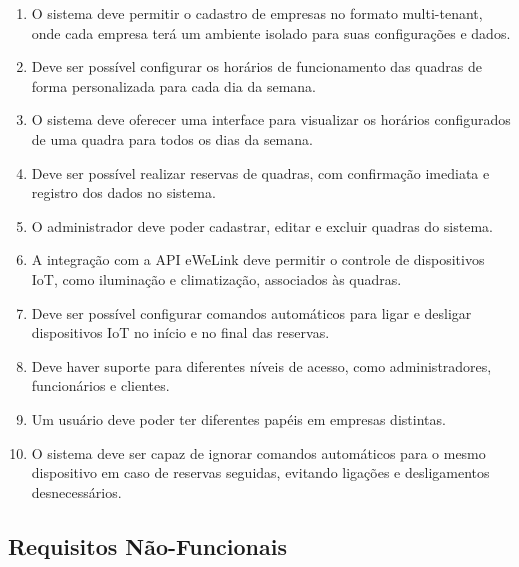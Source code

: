 \begin{enumerate}
     \item O sistema deve permitir o cadastro de empresas no formato multi-tenant, onde cada empresa terá um ambiente isolado para suas configurações e dados.
     \item Deve ser possível configurar os horários de funcionamento das quadras de forma personalizada para cada dia da semana.
     \item O sistema deve oferecer uma interface para visualizar os horários configurados de uma quadra para todos os dias da semana.
     \item Deve ser possível realizar reservas de quadras, com confirmação imediata e registro dos dados no sistema.
     \item O administrador deve poder cadastrar, editar e excluir quadras do sistema.
     \item A integração com a API eWeLink deve permitir o controle de dispositivos IoT, como iluminação e climatização, associados às quadras.
     \item Deve ser possível configurar comandos automáticos para ligar e desligar dispositivos IoT no início e no final das reservas.
     \item Deve haver suporte para diferentes níveis de acesso, como administradores, funcionários e clientes.
     \item Um usuário deve poder ter diferentes papéis em empresas distintas.
     \item O sistema deve ser capaz de ignorar comandos automáticos para o mesmo dispositivo em caso de reservas seguidas, evitando ligações e desligamentos desnecessários.
\end{enumerate}

\subsection{Requisitos Não-Funcionais}\label{subsec:requisitos_nao_funcionais}

